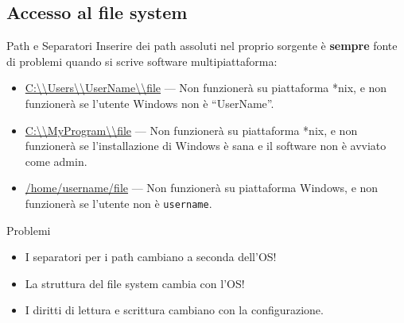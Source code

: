 \documentclass[presentation]{beamer}
\begin{document}
\subsection{Accesso al file system}
\begin{frame}{Path e Separatori}
	Inserire dei path assoluti nel proprio sorgente è \textbf{sempre} fonte di problemi quando si scrive software multipiattaforma:
	\begin{itemize}
		\item \url{C:\\Users\\UserName\\file} --- Non funzionerà su piattaforma *nix, e non funzionerà se l'utente Windows non è ``UserName''.

		\item \url{C:\\MyProgram\\file} --- Non funzionerà su piattaforma *nix, e non funzionerà se l'installazione di Windows è sana e il software non è avviato come admin.

		\item \url{/home/username/file} --- Non funzionerà su piattaforma Windows, e non funzionerà se l'utente non è \texttt{username}.
	\end{itemize}
	\begin{block}{Problemi}
		\begin{itemize}
			\item I separatori per i path cambiano a seconda dell'OS!
			\item La struttura del file system cambia con l'OS!
			\item I diritti di lettura e scrittura cambiano con la configurazione.
		\end{itemize}
		\end{block}
\end{frame}
\end{document}
